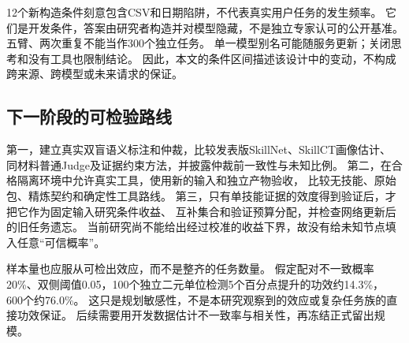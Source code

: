 12个新构造条件刻意包含CSV和日期陷阱，不代表真实用户任务的发生频率。
它们是开发条件，答案由研究者构造并对模型隐藏，不是独立专家认可的公开基准。
五臂、两次重复不能当作300个独立任务。
单一模型别名可能随服务更新；关闭思考和没有工具也限制结论。
因此，本文的条件区间描述该设计中的变动，不构成跨来源、跨模型或未来请求的保证。

\subsection{下一阶段的可检验路线}
第一，建立真实双盲语义标注和仲裁，比较发表版SkillNet、SkillCT画像估计、
同材料普通Judge及证据约束方法，并披露仲裁前一致性与未知比例。
第二，在合格隔离环境中允许真实工具，使用新的输入和独立产物验收，
比较无技能、原始包、精炼契约和确定性工具路线。
第三，只有单技能证据的效度得到验证后，才把它作为固定输入研究条件收益、
互补集合和验证预算分配，并检查网络更新后的旧任务遗忘\citep{P03,P06,P07,P23}。
当前研究尚不能给出经过校准的收益下界，故没有给未知节点填入任意“可信概率”。

样本量也应服从可检出效应，而不是整齐的任务数量。
假定配对不一致概率20\%、双侧阈值0.05，100个独立二元单位检测5个百分点提升的功效约14.3\%，
600个约76.0\%。
这只是规划敏感性，不是本研究观察到的效应或复杂任务族的直接功效保证。
后续需要用开发数据估计不一致率与相关性，再冻结正式留出规模。
